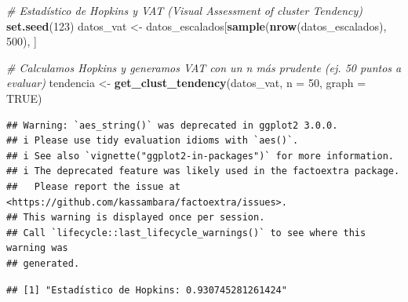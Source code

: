 \documentclass[
]{article}
\newenvironment{Shaded}{\begin{snugshade}}{\end{snugshade}}
\newcommand{\AttributeTok}[1]{\textcolor[rgb]{0.13,0.29,0.53}{#1}}
\newcommand{\CommentTok}[1]{\textcolor[rgb]{0.56,0.35,0.01}{\textit{#1}}}
\newcommand{\ConstantTok}[1]{\textcolor[rgb]{0.56,0.35,0.01}{#1}}
\newcommand{\DecValTok}[1]{\textcolor[rgb]{0.00,0.00,0.81}{#1}}
\newcommand{\FunctionTok}[1]{\textcolor[rgb]{0.13,0.29,0.53}{\textbf{#1}}}
\newcommand{\NormalTok}[1]{#1}
\newcommand{\OtherTok}[1]{\textcolor[rgb]{0.56,0.35,0.01}{#1}}
\newcommand{\SpecialCharTok}[1]{\textcolor[rgb]{0.81,0.36,0.00}{\textbf{#1}}}
\newcommand{\StringTok}[1]{\textcolor[rgb]{0.31,0.60,0.02}{#1}}
\begin{document}
\begin{Shaded}
\begin{Highlighting}[]
\CommentTok{\# Estadístico de Hopkins y VAT (Visual Assessment of cluster Tendency)}
\FunctionTok{set.seed}\NormalTok{(}\DecValTok{123}\NormalTok{)}
\NormalTok{datos\_vat }\OtherTok{\textless{}{-}}\NormalTok{ datos\_escalados[}\FunctionTok{sample}\NormalTok{(}\FunctionTok{nrow}\NormalTok{(datos\_escalados), }\DecValTok{500}\NormalTok{), ]}

\CommentTok{\# Calculamos Hopkins y generamos VAT con un \textquotesingle{}n\textquotesingle{} más prudente (ej. 50 puntos a evaluar)}
\NormalTok{tendencia }\OtherTok{\textless{}{-}} \FunctionTok{get\_clust\_tendency}\NormalTok{(datos\_vat, }\AttributeTok{n =} \DecValTok{50}\NormalTok{, }\AttributeTok{graph =} \ConstantTok{TRUE}\NormalTok{)}
\end{Highlighting}
\end{Shaded}

\begin{verbatim}
## Warning: `aes_string()` was deprecated in ggplot2 3.0.0.
## i Please use tidy evaluation idioms with `aes()`.
## i See also `vignette("ggplot2-in-packages")` for more information.
## i The deprecated feature was likely used in the factoextra package.
##   Please report the issue at <https://github.com/kassambara/factoextra/issues>.
## This warning is displayed once per session.
## Call `lifecycle::last_lifecycle_warnings()` to see where this warning was
## generated.
\end{verbatim}

\begin{Shaded}
\end{Shaded}

\begin{verbatim}
## [1] "Estadístico de Hopkins: 0.930745281261424"
\end{verbatim}

\begin{Shaded}
\end{Shaded}
\end{document}
